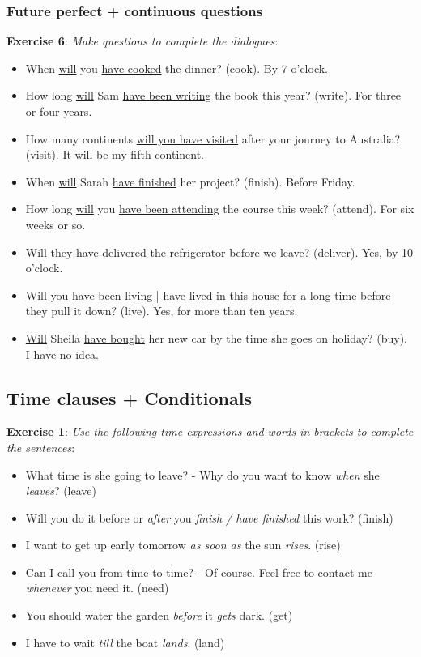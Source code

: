 \subsubsection{Future perfect + continuous questions}

\textbf{Exercise 6}: \textit{Make questions to complete the dialogues}:

\begin{itemize}

\item When \underline{will} you \underline{have cooked} the dinner? (cook). By 7 o'clock.
\item How long \underline{will} Sam \underline{have been writing} the book this year? (write). For three or four years.
\item How many continents \underline{will you have visited} after your journey to Australia? (visit). It will be my fifth continent.
\item When \underline{will} Sarah \underline{have finished} her project? (finish). Before Friday.
\item How long \underline{will} you \underline{have been attending} the course this week? (attend). For six weeks or so.
\item \underline{Will} they \underline{have delivered} the refrigerator before we leave? (deliver). Yes, by 10 o'clock.
\item \underline{Will} you \underline{have been living | have lived} in this house for a long time before
 they pull it down? (live). Yes, for more than ten years.  
\item \underline{Will} Sheila \underline{have bought} her new car by the time she goes on holiday? (buy). I have no idea.

\end{itemize}

\subsection{Time clauses + Conditionals}

\textbf{Exercise 1}: \textit{Use the following time expressions and words 
in brackets to complete the sentences}:

\begin{itemize}

\item What time is she going to leave? - Why do you want to know \textit{when} she \textit{leaves}? (leave)
\item Will you do it before or \textit{after} you \textit{finish / have finished} this work? (finish)
\item I want to get up early tomorrow \textit{as soon as} the sun \textit{rises}. (rise)
\item Can I call you from time to time? - Of course. Feel free to contact me \textit{whenever} you need it. (need)
\item You should  water the garden \textit{before} it \textit{gets} dark. (get)
\item I have to wait \textit{till} the boat \textit{lands}. (land)

\end{itemize}


